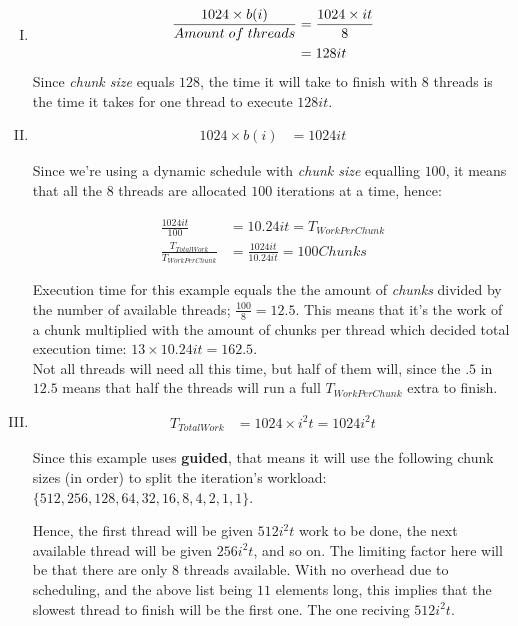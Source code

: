 \documentclass[fontsize=11pt, paper=a4, titlepage]{article}
\begin{document}
\begin{enumerate}[a)]
\begin{enumerate}[I)]
        \item\begin{align*}
            \frac{1024\times b(i)}{Amount\thickspace of\thickspace threads} &=
            \frac{1024\times it}{8}\\
            &= 128it
        \end{align*}
        Since \textit{chunk size} equals $128$, the time it will take to finish
with $8$ threads is the time it takes for one thread to execute $128it$.

        \item\begin{align*}
            1024\times b(i) &= 1024it
        \end{align*}

        Since we're using a dynamic schedule  with \textit{chunk size} equalling
$100$, it means that all the $8$ threads are allocated $100$ iterations at a
time, hence:

        \begin{align*}
            \frac{1024it}{100} &= 10.24it = T_{WorkPerChunk}\\
            \frac{T_{TotalWork}}{T_{WorkPerChunk}} &= \frac{1024it}{10.24it} = 100 Chunks
        \end{align*}

        Execution time for this example equals the the amount of \textit{chunks}
divided by the number of available threads; $\frac{100}{8}= 12.5$. This means
that it's the work of a chunk multiplied with the amount of chunks per thread
which decided total execution time: $13\times 10.24it = 162.5$. \\

Not all threads will need all this time, but half of them will, since the $.5$
in $12.5$ means that half the threads will run a full $T_{WorkPerChunk}$ extra
to finish.

        \item\begin{align*}
            T_{TotalWork} &= 1024\times i^2t = 1024i^2t
        \end{align*}

        Since this example uses \textbf{guided}, that means it will use the
following chunk sizes (in order) to split the iteration's workload: $\{512, 256,
128, 64, 32, 16, 8, 4, 2, 1, 1\}$.

Hence, the first thread will be given $512i^2t$ work to be done, the next
available thread will be given $256i^2t$, and so on. The limiting factor here
will be that there are only $8$ threads available. With no overhead due to
scheduling, and the above list being $11$ elements long, this implies that the
slowest thread to finish will be the first one. The one reciving $512i^2t$. \\



\end{enumerate}
\end{enumerate}
\end{document}
